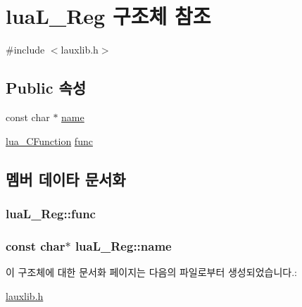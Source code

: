 \hypertarget{structlua_l___reg}{\section{lua\-L\-\_\-\-Reg 구조체 참조}
\label{structlua_l___reg}
}


{\ttfamily \#include $<$lauxlib.\-h$>$}

\subsection*{\-Public 속성}
\begin{DoxyCompactItemize}
\item 
const char $\ast$ \hyperlink{structlua_l___reg_a58b99f63b304e5c489b90d812f92cba2}{name}
\item 
\hyperlink{lua_8h_a5f5bedea265eccf43c6e404e020988ce}{lua\-\_\-\-C\-Function} \hyperlink{structlua_l___reg_a54aa8f9955870caf78148514e61196ce}{func}
\end{DoxyCompactItemize}


\subsection{멤버 데이타 문서화}
\hypertarget{structlua_l___reg_a54aa8f9955870caf78148514e61196ce}{
\subsubsection[{func}]{ {\bf lua\-L\-\_\-\-Reg\-::func}}}\label{structlua_l___reg_a54aa8f9955870caf78148514e61196ce}
\hypertarget{structlua_l___reg_a58b99f63b304e5c489b90d812f92cba2}{
\subsubsection[{name}]{\setlength{\rightskip}{0pt plus 5cm}const char$\ast$ {\bf lua\-L\-\_\-\-Reg\-::name}}}\label{structlua_l___reg_a58b99f63b304e5c489b90d812f92cba2}


이 구조체에 대한 문서화 페이지는 다음의 파일로부터 생성되었습니다.\-:\begin{DoxyCompactItemize}
\item 
\hyperlink{lauxlib_8h}{lauxlib.\-h}\end{DoxyCompactItemize}
